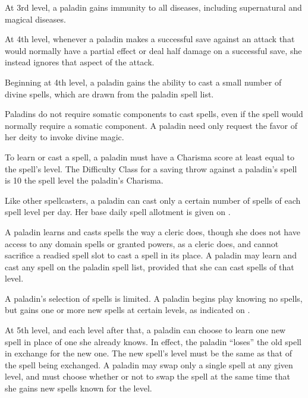  At 3rd level, a paladin gains immunity to all diseases, including supernatural and magical diseases.

 At 4th level, whenever a paladin makes a successful save against an attack that would normally have a partial effect or deal half damage on a successful save, she instead ignores that aspect of the attack.

 Beginning at 4th level, a paladin gains the ability to cast a small number of divine spells, which are drawn from the paladin spell list.

Paladins do not require somatic components to cast spells, even if the spell would normally require a somatic component. A paladin need only request the favor of her deity to invoke divine magic.

\par To learn or cast a spell, a paladin must have a Charisma score at least equal to the spell's level. The Difficulty Class for a saving throw against a paladin's spell is 10 \add the spell level \add the paladin's Charisma.

\par Like other spellcasters, a paladin can cast only a certain number of spells of each spell level per day. Her base daily spell allotment is given on .

A paladin learns and casts spells the way a cleric does, though she does not have access to any domain spells or granted powers, as a cleric does, and cannot sacrifice a readied spell slot to cast a  spell in its place. A paladin may learn and cast any spell on the paladin spell list, provided that she can cast spells of that level.

A paladin's selection of spells is limited. A paladin begins play knowing no spells, but gains one or more new spells at certain levels, as indicated on .

\par At 5th level, and each level after that, a paladin can choose to learn one new spell in place of one she already knows. In effect, the paladin ``loses'' the old spell in exchange for the new one. The new spell's level must be the same as that of the spell being exchanged. A paladin may swap only a single spell at any given level, and must choose whether or not to swap the spell at the same time that she gains new spells known for the level.

